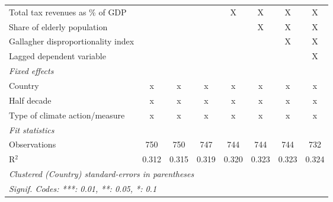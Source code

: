 \begin{table}[htbp]
\begin{tabular}{lccccccc}
      Total tax revenues as \% of GDP                                  &              &               &               & X             & X             & X             & X\\  
      Share of elderly population                                      &              &               &               &               & X             & X             & X\\  
      Gallagher disproportionality index                               &              &               &               &               &               & X             & X\\  
      Lagged dependent variable                                        &              &               &               &               &               &               & X\\  
      \emph{Fixed effects}\\
      Country                                                          & x            & x             & x             & x             & x             & x             & x\\  
      Half decade                                                      & x            & x             & x             & x             & x             & x             & x\\  
      Type of climate action/measure                                   & x            & x             & x             & x             & x             & x             & x\\  
      \midrule \emph{Fit statistics}\\
      Observations                                                     & 750          & 750           & 747           & 744           & 744           & 744           & 732\\  
      R$^2$                                                            & 0.312        & 0.315         & 0.319         & 0.320         & 0.323         & 0.323         & 0.324\\  
      \midrule
      \multicolumn{8}{l}{\emph{Clustered (Country) standard-errors in parentheses}}\\
      \multicolumn{8}{l}{\emph{Signif. Codes: ***: 0.01, **: 0.05, *: 0.1}}\\
   \end{tabular}
\end{table}


